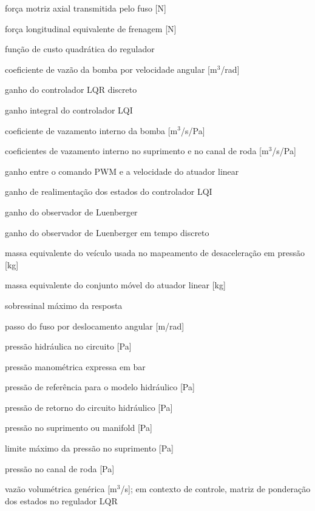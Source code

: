 \begin{simbolos}
    \item[$F_m$] força motriz axial transmitida pelo fuso [N]
    \item[$F_{x,\mathrm{eq}}$] força longitudinal equivalente de frenagem [N]
    \item[$J$] função de custo quadrática do regulador
    \item[$K_b$] coeficiente de vazão da bomba por velocidade angular [m$^3$/rad]
    \item[$K_d$] ganho do controlador LQR discreto
    \item[$K_i$] ganho integral do controlador LQI
    \item[$K_{lb}$] coeficiente de vazamento interno da bomba [m$^3$/s/Pa]
    \item[$K_{ls}$, $K_{lw}$] coeficientes de vazamento interno no suprimento e no canal de roda [m$^3$/s/Pa]
    \item[$K_{\mathrm{vel}}$] ganho entre o comando PWM e a velocidade do atuador linear
    \item[$K_x$] ganho de realimentação dos estados do controlador LQI
    \item[$L$] ganho do observador de Luenberger
    \item[$L_d$] ganho do observador de Luenberger em tempo discreto
    \item[$m$] massa equivalente do veículo usada no mapeamento de desaceleração em pressão [kg]
    \item[$m_{eq}$] massa equivalente do conjunto móvel do atuador linear [kg]
    \item[$M_p$] sobressinal máximo da resposta
    \item[$p_s$] passo do fuso por deslocamento angular [m/rad]
    \item[$P$] pressão hidráulica no circuito [Pa]
    \item[$P_g$] pressão manométrica expressa em bar
    \item[$P_{\mathrm{ref}}$] pressão de referência para o modelo hidráulico [Pa]
    \item[$P_{ret}$] pressão de retorno do circuito hidráulico [Pa]
    \item[$P_{sup}$] pressão no suprimento ou manifold [Pa]
    \item[$P_{sup,\max}$] limite máximo da pressão no suprimento [Pa]
    \item[$P_w$] pressão no canal de roda [Pa]
    \item[$Q$] vazão volumétrica genérica [m$^3$/s]; em contexto de controle, matriz de ponderação dos estados no regulador LQR

\end{simbolos}
